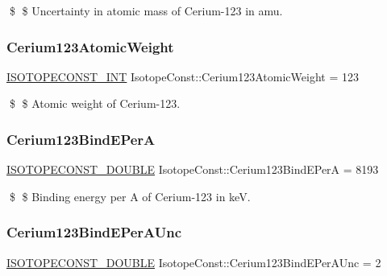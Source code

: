 \$ \$ Uncertainty in atomic mass of Cerium-\/123 in amu. \mbox{\label{group___isotope_const-_cerium-_ce123_ga1bf1dcab69aa1c8f7cd76020144affa7}} 
\subsubsection{\texorpdfstring{Cerium123\+Atomic\+Weight}{Cerium123AtomicWeight}}
{\footnotesize\ttfamily \mbox{\hyperlink{group___isotope_const-_macros_ga5f18360b3e99483a35c32d789e62621c}{I\+S\+O\+T\+O\+P\+E\+C\+O\+N\+S\+T\+\_\+\+I\+NT}} Isotope\+Const\+::\+Cerium123\+Atomic\+Weight = 123}

\$ \$ Atomic weight of Cerium-\/123. \mbox{\label{group___isotope_const-_cerium-_ce123_ga0cedc54d215c1824c684d3f24c24970d}} 
\subsubsection{\texorpdfstring{Cerium123\+Bind\+E\+PerA}{Cerium123BindEPerA}}
{\footnotesize\ttfamily \mbox{\hyperlink{group___isotope_const-_macros_ga8f45a7272ce02c0b4c65c44636ed719a}{I\+S\+O\+T\+O\+P\+E\+C\+O\+N\+S\+T\+\_\+\+D\+O\+U\+B\+LE}} Isotope\+Const\+::\+Cerium123\+Bind\+E\+PerA = 8193}

\$ \$ Binding energy per A of Cerium-\/123 in keV. \mbox{\label{group___isotope_const-_cerium-_ce123_ga5e487d0951ad22f67c29d8773d8a0098}} 
\subsubsection{\texorpdfstring{Cerium123\+Bind\+E\+Per\+A\+Unc}{Cerium123BindEPerAUnc}}
{\footnotesize\ttfamily \mbox{\hyperlink{group___isotope_const-_macros_ga8f45a7272ce02c0b4c65c44636ed719a}{I\+S\+O\+T\+O\+P\+E\+C\+O\+N\+S\+T\+\_\+\+D\+O\+U\+B\+LE}} Isotope\+Const\+::\+Cerium123\+Bind\+E\+Per\+A\+Unc = 2}

